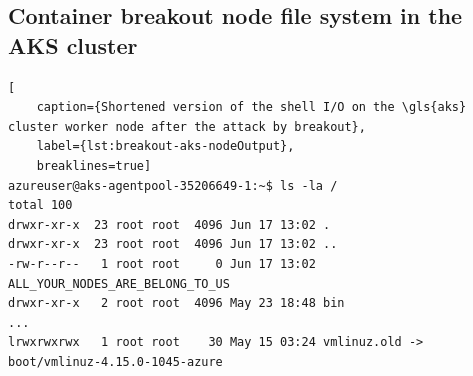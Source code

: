 \subsection{Container breakout node file system in the AKS cluster}

\begin{lstlisting}[
	caption={Shortened version of the shell I/O on the \gls{aks} cluster worker node after the attack by breakout},
	label={lst:breakout-aks-nodeOutput},
	breaklines=true]
azureuser@aks-agentpool-35206649-1:~$ ls -la /
total 100
drwxr-xr-x  23 root root  4096 Jun 17 13:02 .
drwxr-xr-x  23 root root  4096 Jun 17 13:02 ..
-rw-r--r--   1 root root     0 Jun 17 13:02 ALL_YOUR_NODES_ARE_BELONG_TO_US
drwxr-xr-x   2 root root  4096 May 23 18:48 bin
...
lrwxrwxrwx   1 root root    30 May 15 03:24 vmlinuz.old -> boot/vmlinuz-4.15.0-1045-azure
\end{lstlisting}

